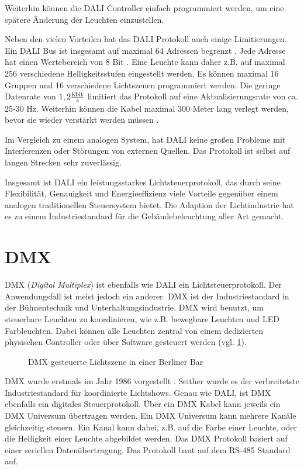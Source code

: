 Weiterhin können die DALI Controller einfach programmiert werden, um eine spätere Änderung der Leuchten einzustellen.

Neben den vielen Vorteilen hat das DALI Protokoll auch einige Limitierungen. Ein DALI Bus ist insgesamt auf maximal 64 Adressen begrenzt \cite[S.7]{DALI_Handbuch}. Jede Adresse hat einen Wertebereich von 8 Bit \cite[S.1]{DALI-Lichtmanagement}. Eine Leuchte kann daher z.B. auf maximal 256 verschiedene Helligkeitsstufen eingestellt werden. Es können maximal 16 Gruppen und 16 verschiedene Lichtszenen programmiert werden. Die geringe Datenrate von $1,2 \frac{\SI{}{\kilo\bit}}{\SI{}{\s}}$ limitiert das Protokoll auf eine Aktualisierungsrate von ca. 25-30 Hz\cite[S.4]{DALI_Handbuch}. Weiterhin können die Kabel maximal 300 Meter lang verlegt werden, bevor sie wieder verstärkt werden müssen \cite[S.3]{DALI_Handbuch}. 

Im Vergleich zu einem analogen System, hat DALI keine großen Probleme mit Interferenzen oder Störungen von externen Quellen. Das Protokoll ist selbst auf langen Strecken sehr zuverlässig.

Insgesamt ist DALI ein leistungsstarkes Lichtsteuerprotokoll, das durch seine Flexibilität, Genauigkeit und Energieeffizienz viele Vorteile gegenüber einem analogen traditionellen Steuersystem bietet. Die Adaption der Lichtindustrie hat es zu einem Industriestandard für die Gebäudebeleuchtung aller Art gemacht.

\section{DMX}

DMX (\emph{Digital Multiplex}) ist ebenfalls wie DALI ein Lichtsteuerprotokoll. Der Anwendungsfall ist meist jedoch ein anderer. DMX ist der Industriestandard in der Bühnentechnik und Unterhaltungsindustrie. DMX wird benutzt, um steuerbare Leuchten zu koordinieren, wie z.B. bewegbare Leuchten und LED Farbleuchten. Dabei können alle Leuchten zentral von einem dedizierten physischen Controller oder über Software gesteuert werden (vgl. \ref{fig:dmx_use_example}).


\begin{figure}[H]
	\centering
	\caption{DMX gesteuerte Lichtszene in einer Berliner Bar}
	\label{fig:dmx_use_example}
\end{figure}


DMX wurde erstmals im Jahr 1986 vorgestellt \cite[S.5, ch. 2.1]{DMX101-Handbook}. Seither wurde es der verbreitetste Industriestandard für koordinierte Lichtshows. Genau wie DALI, ist DMX ebenfalls ein digitales Steuerprotokoll. Über ein DMX Kabel kann jeweils ein DMX Universum übertragen werden. Ein DMX Universum kann mehrere Kanäle gleichzeitig steuern. Ein Kanal kann dabei, z.B. auf die Farbe einer Leuchte, oder die Helligkeit einer Leuchte abgebildet werden. Das DMX Protokoll basiert auf einer seriellen Datenübertragung. Das Protokoll baut auf dem RS-485 Standard\cite[S.11, ch. 3.2]{DMX101-Handbook} auf.

